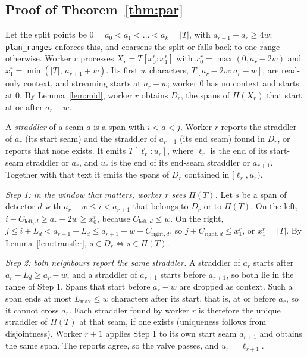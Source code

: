 \documentclass[pdflatex,sn-mathphys-num]{sn-jnl}
\theoremstyle{thmstyleone}
\theoremstyle{thmstylethree}
\begin{document}
\begin{appendices}
\subsection{Proof of Theorem~\ref{thm:par}}

Let the split points be $0 = a_0 < a_1 < \dots < a_k = |T|$, with $a_{r+1} - a_r \ge 4w$; \texttt{plan\_ranges} enforces this, and coarsens the split or falls back to one range otherwise. Worker $r$ processes $X_r = T[x_0^{r} : x_1^{r}]$ with $x_0^{r} = \max(0, a_r - 2w)$ and $x_1^{r} = \min(|T|,\, a_{r+1} + w)$. Its first $w$ characters, $T[a_r - 2w : a_r - w]$, are read-only context, and streaming starts at $a_r - w$; worker $0$ has no context and starts at $0$. By Lemma~\ref{lem:mid}, worker $r$ obtains $D_r$, the spans of $\Pi(X_r)$ that start at or after $a_r - w$.

A \emph{straddler} of a seam $a$ is a span with $i < a < j$. Worker $r$ reports the straddler of $a_r$ (its start seam) and the straddler of $a_{r+1}$ (its end seam) found in $D_r$, or reports that none exists. It emits $T[\ell_r : u_r]$, where $\ell_r$ is the end of its start-seam straddler or $a_r$, and $u_r$ is the end of its end-seam straddler or $a_{r+1}$. Together with that text it emits the spans of $D_r$ contained in $[\ell_r, u_r)$.

\emph{Step 1: in the window that matters, worker $r$ sees $\Pi(T)$.} Let $s$ be a span of detector $d$ with $a_r - w \le i < a_{r+1}$ that belongs to $D_r$ or to $\Pi(T)$. On the left, $i - C_{\mathrm{left},d} \ge a_r - 2w \ge x_0^{r}$, because $C_{\mathrm{left},d} \le w$. On the right, $j \le i + L_d < a_{r+1} + L_d \le a_{r+1} + w - C_{\mathrm{right},d}$, so $j + C_{\mathrm{right},d} \le x_1^{r}$, or $x_1^{r} = |T|$. By Lemma~\ref{lem:transfer}, $s \in D_r \Leftrightarrow s \in \Pi(T)$.

\emph{Step 2: both neighbours report the same straddler.} A straddler of $a_r$ starts after $a_r - L_d \ge a_r - w$, and a straddler of $a_{r+1}$ starts before $a_{r+1}$, so both lie in the range of Step 1. Spans that start before $a_r - w$ are dropped as context. Such a span ends at most $L_{\max} \le w$ characters after its start, that is, at or before $a_r$, so it cannot cross $a_r$. Each straddler found by worker $r$ is therefore the unique straddler of $\Pi(T)$ at that seam, if one exists (uniqueness follows from disjointness). Worker $r+1$ applies Step 1 to its own start seam $a_{r+1}$ and obtains the same span. The reports agree, so the valve passes, and $u_r = \ell_{r+1}$.


\end{appendices}
\end{document}
